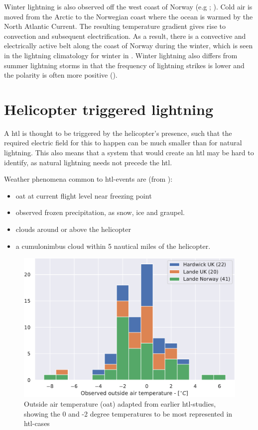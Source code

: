 Winter lightning is also observed off the west coast of Norway (e.g \cite{march2016}; \cite{koeltzow2018}). Cold air is moved from the Arctic to the Norwegian coast where the ocean is warmed by the North Atlantic Current. The resulting temperature gradient gives rise to convection and subsequent electrification. As a result, there is a convective and electrically active belt along the coast of Norway during the winter, which is seen in the lightning climatology for winter in \cite{koeltzow2018}. Winter lightning also differs from summer lightning storms in that the frequency of lightning strikes is lower and the polarity is often more positive (\cite{michimoto2007}).
 
\section{Helicopter triggered lightning}
A \acrlong{htl} is thought to be triggered by the helicopter's presence, such that the required electric field for this to happen can be much smaller than for natural lightning. This also means that a system that would create an \acrshort{htl} may be hard to identify, as natural lightning needs not precede the \acrshort{htl}. 

Weather phenomena common to \acrshort{htl}-events are (from \cite{lande1999}):
\begin{itemize}
 \item \acrfull{oat} at current flight level near freezing point 
 \item observed frozen precipitation, as snow, ice and graupel.
 \item clouds around or above the helicopter
 \item a cumulonimbus cloud within 5 nautical miles of the helicopter.
\end{itemize}

\begin{figure}
    \centering
    \includegraphics[width=\textwidth]{Figures/LandeTemp.pdf}
    \caption{Outside air temperature (\acrshort{oat}) adapted from earlier \acrshort{htl}-studies, showing the 0 and -2 degree temperatures to be most represented in \acrshort{htl}-cases} 
    \label{fig:landetemp}
\end{figure}

